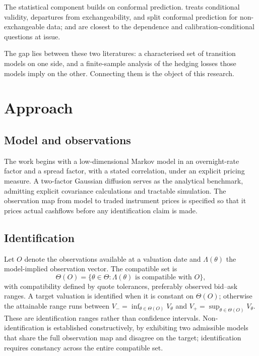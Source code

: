 \documentclass[12pt,final]{article}
\begin{document}
	The statistical component builds on conformal prediction. \citet{vovk2012}
	treats conditional validity, \citet{barber2023} departures from
	exchangeability, and \citet{oliveira2024} split conformal prediction for
	non-exchangeable data; \citet{barber2026} and \citet{ramos2026} are closest
	to the dependence and calibration-conditional questions at issue.

	The gap lies between these two literatures: a characterised set of transition
	models on one side, and a finite-sample analysis of the hedging losses those
	models imply on the other. Connecting them is the object of this research.

	\section{Approach}

	\subsection{Model and observations}

	The work begins with a low-dimensional Markov model in an overnight-rate
	factor and a spread factor, with a stated correlation, under an explicit
	pricing measure. A two-factor Gaussian diffusion serves as the analytical
	benchmark, admitting explicit covariance calculations and tractable
	simulation. The observation map from model to traded instrument prices is
	specified so that it prices actual cashflows before any identification claim
	is made.

	\subsection{Identification}

	Let $O$ denote the observations available at a valuation date and
	$\Lambda(\theta)$ the model-implied observation vector. The compatible set is
	\begin{equation}
		\Theta(O) = \{\theta \in \Theta : \Lambda(\theta) \text{ is compatible with } O\},
	\end{equation}
	with compatibility defined by quote tolerances, preferably observed bid--ask
	ranges. A target valuation is identified when it is constant on $\Theta(O)$;
	otherwise the attainable range runs between
	$V_{-} = \inf_{\theta \in \Theta(O)} V_{\theta}$ and
	$V_{+} = \sup_{\theta \in \Theta(O)} V_{\theta}$. These are identification
	ranges rather than confidence intervals. Non-identification is established
	constructively, by exhibiting two admissible models that share the full
	observation map and disagree on the target; identification requires
	constancy across the entire compatible set.
\end{document}
